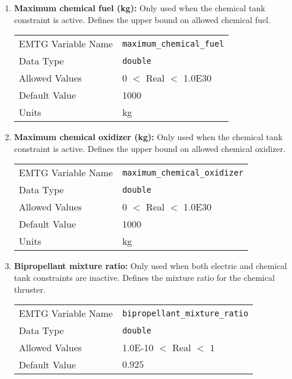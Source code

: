 \begin{enumerate}
    \item \textbf{Maximum chemical fuel (kg):} Only used when the chemical tank constraint is active. Defines the upper bound on allowed chemical fuel.
    \begin{table}[H]
        \hspace{2cm}
        \begin{tabular}{lp{5cm}}
        \ac{EMTG} Variable Name & \verb|maximum_chemical_fuel| \\
        Data Type & \verb|double| \\
        Allowed Values & $0$ $<$ Real $<$ 1.0E30 \\
        Default Value & 1000 \\
        Units & kg
        \end{tabular}
    \end{table}

    \item \textbf{Maximum chemical oxidizer (kg):} Only used when the chemical tank constraint is active. Defines the upper bound on allowed chemical oxidizer.
    \begin{table}[H]
        \hspace{2cm}
        \begin{tabular}{lp{5cm}}
        \ac{EMTG} Variable Name & \verb|maximum_chemical_oxidizer| \\
        Data Type & \verb|double| \\
        Allowed Values & $0$ $<$ Real $<$ 1.0E30 \\
        Default Value & 1000 \\
        Units & kg
        \end{tabular}
    \end{table}
    
    \item \textbf{Bipropellant mixture ratio:} Only used when both electric and chemical tank constraints are inactive. Defines the mixture ratio for the chemical thruster.
    \begin{table}[H]
        \hspace{2cm}
        \begin{tabular}{lp{5cm}}
        \ac{EMTG} Variable Name & \verb|bipropellant_mixture_ratio| \\
        Data Type & \verb|double| \\
        Allowed Values & 1.0E-10 $<$ Real $<$ $1$ \\
        Default Value & $0.925$ \\
        \end{tabular}
    \end{table}
\end{enumerate}




